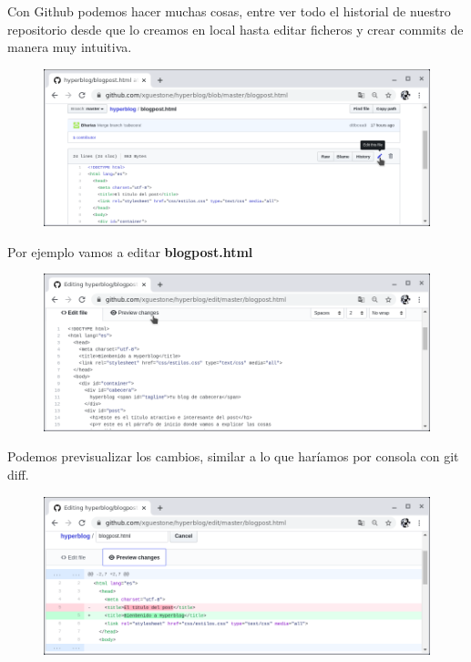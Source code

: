\documentclass{article}
\begin{document}
Con Github podemos hacer muchas cosas, entre ver todo el historial de nuestro
repositorio desde que lo creamos en local hasta editar ficheros y crear commits
de manera muy intuitiva.

\newpage

\begin{figure}[h!]
  \centering
  \includegraphics[scale=0.75]{./Pictures/201_github_edit.png}
\end{figure}

Por ejemplo vamos a editar \textbf{blogpost.html}

\begin{figure}[h!]
  \centering
  \includegraphics[scale=0.75]{./Pictures/202_blogpost_edit.png}
\end{figure}

Podemos previsualizar los cambios, similar a lo que haríamos por consola con
git diff.

\begin{figure}[h!]
  \centering
  \includegraphics[scale=0.75]{./Pictures/203_preview_changes.png}
\end{figure}
\end{document}
